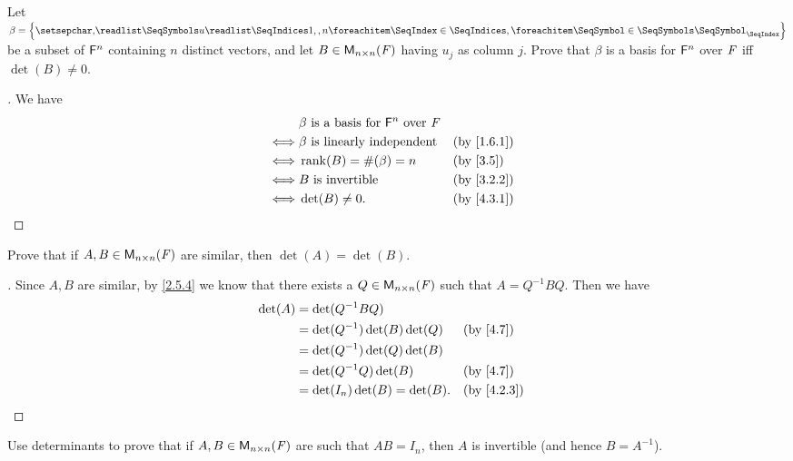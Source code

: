 \begin{ex}\label{ex:4.3.14}
	Let \(\beta = \set{\seq{u}{1,,n}}\) be a subset of \(\mathsf{F}^n\) containing \(n\) distinct vectors, and let \(B \in \ms[n][n][\F]\) having \(u_j\) as column \(j\).
	Prove that \(\beta\) is a basis for \(\mathsf{F}^n\) over \(\mathit{F}\) iff \(\det(B) \neq 0\).
\end{ex}

\begin{proof}[]
	We have
	\begin{align*}
		     & \beta \text{ is a basis for } \vs{F}^n \text{ over } \F                 \\
		\iff & \beta \text{ is linearly independent}                   &  & \by{1.6.1} \\
		\iff & \rk{B} = \#(\beta) = n                                  &  & \by{3.5}   \\
		\iff & B \text{ is invertible}                                 &  & \by{3.2.2} \\
		\iff & \det(B) \neq 0.                                         &  & \by{4.3.1}
	\end{align*}
\end{proof}

\begin{ex}\label{ex:4.3.15}
	Prove that if \(A, B \in \ms[n][n][\F]\) are similar, then \(\det(A) = \det(B)\).
\end{ex}

\begin{proof}[]
	Since \(A, B\) are similar, by \cref{2.5.4} we know that there exists a \(Q \in \ms[n][n][\F]\) such that \(A = Q^{-1} B Q\).
	Then we have
	\begin{align*}
		\det(A) & = \det(Q^{-1} B Q)                             \\
		        & = \det(Q^{-1}) \det(B) \det(Q) &  & \by{4.7}   \\
		        & = \det(Q^{-1}) \det(Q) \det(B)                 \\
		        & = \det(Q^{-1} Q) \det(B)       &  & \by{4.7}   \\
		        & = \det(I_n) \det(B) = \det(B). &  & \by{4.2.3}
	\end{align*}
\end{proof}

\begin{ex}\label{ex:4.3.16}
	Use determinants to prove that if \(A, B \in \ms[n][n][\F]\) are such that \(AB = I_n\), then \(A\) is invertible
	(and hence \(B = A^{-1}\)).
\end{ex}

